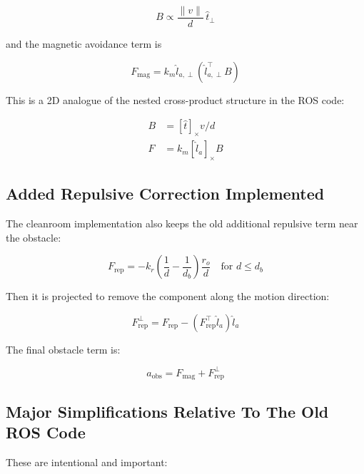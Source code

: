 \documentclass[11pt]{article}
\begin{document}
\begin{equation}
B \propto \frac{\lVert v \rVert}{d}\,\hat{t}_{\perp}
\end{equation}

and the magnetic avoidance term is

\begin{equation}
F_{\text{mag}}
=
k_m \hat{l}_{a,\perp}(\hat{l}_{a,\perp}^\top B)
\end{equation}

This is a 2D analogue of the nested cross-product structure in the ROS code:

\begin{align}
B &= [\hat{t}]_{\times} v / d \\
F &= k_m [\hat{l}_a]_{\times} B
\end{align}

\subsection*{Added Repulsive Correction Implemented}

The cleanroom implementation also keeps the old additional repulsive term near
the obstacle:

\begin{equation}
F_{\text{rep}}
=
-k_r \left(\frac{1}{d} - \frac{1}{d_b}\right)\frac{r_o}{d}
\quad \text{for } d \le d_b
\end{equation}

Then it is projected to remove the component along the motion direction:

\begin{equation}
F_{\text{rep}}^{\perp}
=
F_{\text{rep}} - (F_{\text{rep}}^\top \hat{l}_a)\hat{l}_a
\end{equation}

The final obstacle term is:

\begin{equation}
a_{\text{obs}} = F_{\text{mag}} + F_{\text{rep}}^{\perp}
\end{equation}

\subsection*{Major Simplifications Relative To The Old ROS Code}

These are intentional and important:
\end{document}
